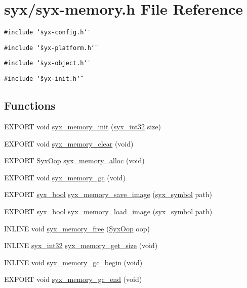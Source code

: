 \hypertarget{syx-memory_8h}{
\section{syx/syx-memory.h File Reference}
\label{syx-memory_8h}
}
{\tt \#include \char`\"{}syx-config.h\char`\"{}}\par
{\tt \#include \char`\"{}syx-platform.h\char`\"{}}\par
{\tt \#include \char`\"{}syx-object.h\char`\"{}}\par
{\tt \#include \char`\"{}syx-init.h\char`\"{}}\par
\subsection*{Functions}
\begin{CompactItemize}
\item 
EXPORT void \hyperlink{syx-memory_8h_565e4803168ca5fa99145c0d15d2da24}{syx\_\-memory\_\-init} (\hyperlink{syx-types_8h_9f31c17555a2dfcf25da84b5c4a2e55b}{syx\_\-int32} size)
\item 
EXPORT void \hyperlink{syx-memory_8h_cbf4870c020690e41fd38b02adfdd62e}{syx\_\-memory\_\-clear} (void)
\item 
EXPORT \hyperlink{syx-types_8h_1121caba2d40b2ce090b640762744ccd}{SyxOop} \hyperlink{syx-memory_8h_54ca482cf9491f7baea6c2ad0f26ae66}{syx\_\-memory\_\-alloc} (void)
\item 
EXPORT void \hyperlink{syx-memory_8h_a5c424be57b4ec70548f0162b9d8792d}{syx\_\-memory\_\-gc} (void)
\item 
EXPORT \hyperlink{syx-types_8h_c6dc09b276b99fa1956364359139daab}{syx\_\-bool} \hyperlink{syx-memory_8h_b5e20fcf4ca01f3925d67c4854209ba3}{syx\_\-memory\_\-save\_\-image} (\hyperlink{syx-types_8h_9663af54b7b72f5d8be5f754ef356525}{syx\_\-symbol} path)
\item 
EXPORT \hyperlink{syx-types_8h_c6dc09b276b99fa1956364359139daab}{syx\_\-bool} \hyperlink{syx-memory_8h_4d442554bbb25bf71781ba6abfa30819}{syx\_\-memory\_\-load\_\-image} (\hyperlink{syx-types_8h_9663af54b7b72f5d8be5f754ef356525}{syx\_\-symbol} path)
\item 
INLINE void \hyperlink{syx-memory_8h_e529b61f2ebc2e51211c4bac3c810c69}{syx\_\-memory\_\-free} (\hyperlink{syx-types_8h_1121caba2d40b2ce090b640762744ccd}{SyxOop} oop)
\item 
INLINE \hyperlink{syx-types_8h_9f31c17555a2dfcf25da84b5c4a2e55b}{syx\_\-int32} \hyperlink{syx-memory_8h_d7aa0c051c34d4da60dcb1bfb4a39775}{syx\_\-memory\_\-get\_\-size} (void)
\item 
INLINE void \hyperlink{syx-memory_8h_ccbca387b22bf3764007fa893f78cefd}{syx\_\-memory\_\-gc\_\-begin} (void)
\item 
EXPORT void \hyperlink{syx-memory_8h_e191746fd44dca483c40c1b06454c357}{syx\_\-memory\_\-gc\_\-end} (void)
\end{CompactItemize}


